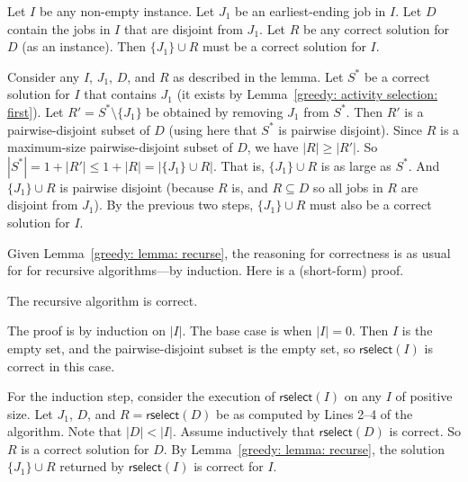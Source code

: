 \begin{lemma}\label{greedy: lemma: recurse}
  Let $I$ be any non-empty  instance.
  Let $J_1$ be an earliest-ending job in $I$.
  Let $D$ contain the jobs in $I$ that are disjoint from $J_1$.
  Let $R$ be any correct solution for $D$ (as an  instance).
  Then $\{J_1\}\cup R$ must be a correct solution for $I$.
\end{lemma}
\begin{longFormProof}
  \step Consider any $I$, $J_1$, $D$, and $R$ as described in the lemma.
  \step Let $S^*$ be a correct solution for $I$ that contains $J_1$ (it exists by Lemma~\ref{greedy: activity selection: first}).
  \step Let $R' = S^*\setminus \{J_1\}$ be obtained by removing $J_1$ from $S^*$.
  \step Then $R'$ is a pairwise-disjoint subset of $D$ (using here that $S^*$ is pairwise disjoint).
  \step Since $R$ is a maximum-size pairwise-disjoint subset of $D$, we have $|R| \ge |R'|$.
  \step So \( |S^*| = 1 + |R'| \le 1+|R| = |\{J_1\} \cup R|\).
  \step That is, $\{J_1\} \cup R$ is as large as $S^*$.
  \step And $\{J_1\} \cup R$ is pairwise disjoint (because $R$ is, and $R\subseteq D$ so all jobs in $R$ are disjoint from $J_1$).
  \step By the previous two steps, $\{J_1\}\cup R$ must also be a correct solution for $I$.
\end{longFormProof}

Given Lemma~\ref{greedy: lemma: recurse},
the reasoning for correctness is as usual for for recursive algorithms---by induction.  Here is a (short-form) proof.

\begin{theorem}\label{greedy: theorem: rselect}
  The recursive algorithm is correct.
\end{theorem}
\begin{shortFormProof}
  The proof is by induction on $|I|$.
  The base case is when $|I| = 0$.
  Then $I$ is the empty set, and the pairwise-disjoint subset is the empty set,
  so $\textsf{rselect}(I)$ is correct in this case.

  For the induction step, consider the execution of $\textsf{rselect}(I)$ on any $I$ of positive size.
  Let $J_1$, $D$, and $R=\textsf{rselect}(D)$ be as computed by Lines 2--4 of the algorithm.
  Note that $|D|<|I|$.
  Assume inductively that $\textsf{rselect}(D)$ is correct.
  So $R$ is a correct solution for $D$.
  By Lemma~\ref{greedy: lemma: recurse},
  the solution $\{J_1\} \cup R$ returned by $\textsf{rselect}(I)$ is correct for $I$.
\end{shortFormProof}

